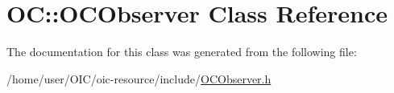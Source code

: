 \hypertarget{classOC_1_1OCObserver}{}\section{O\+C\+:\+:O\+C\+Observer Class Reference}
\label{classOC_1_1OCObserver}


The documentation for this class was generated from the following file\+:\begin{DoxyCompactItemize}
\item 
/home/user/\+O\+I\+C/oic-\/resource/include/\hyperlink{OCObserver_8h}{O\+C\+Observer.\+h}\end{DoxyCompactItemize}
